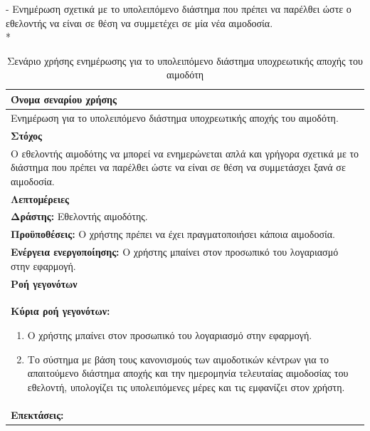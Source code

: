 \newpage		
- Ενημέρωση σχετικά με το υπολειπόμενο διάστημα που πρέπει να παρέλθει ώστε ο εθελοντής να είναι σε θέση να συμμετέχει σε μία νέα αιμοδοσία.
\\*
\begin{table}[H]
	\begin{center}
	    \begin{tabular}{|p{\dimexpr \linewidth-2\tabcolsep}|}
	    \hline
	    \rowcolor{grayy}
	    \textbf{Όνομα σεναρίου χρήσης}
	    \\ \hline    
	     Ενημέρωση για το υπολειπόμενο διάστημα υποχρεωτικής αποχής του αιμοδότη.
	     \\ \hline
	    \rowcolor{grayy}
	    \textbf{\textbf{Στόχος}}
	    \\ \hline
	 	 Ο εθελοντής αιμοδότης να μπορεί να ενημερώνεται απλά και γρήγορα σχετικά με το διάστημα που πρέπει να παρέλθει ώστε να είναι σε θέση να συμμετάσχει ξανά σε αιμοδοσία.
	    \\ \hline
	    \rowcolor{grayy}
	    \textbf{Λεπτομέρειες}
	    \\ \hline
		\textbf{Δράστης:} Εθελοντής αιμοδότης.
		\\*
		\textbf{Προϋποθέσεις:} Ο χρήστης πρέπει να έχει πραγματοποιήσει κάποια αιμοδοσία.
		\\*
		\textbf{Ενέργεια ενεργοποίησης:} Ο χρήστης μπαίνει στον προσωπικό του λογαριασμό στην εφαρμογή.
		\\ \hline
		\rowcolor{grayy}    
	    \textbf{Ροή γεγονότων}
	    \\ \hline
		\textbf{Κύρια ροή γεγονότων:}
		\begin{enumerate}
			\item	 Ο χρήστης μπαίνει στον προσωπικό του λογαριασμό στην εφαρμογή.
			\item  Το σύστημα με βάση τους κανονισμούς των αιμοδοτικών κέντρων για το απαιτούμενο διάστημα αποχής και την ημερομηνία τελευταίας αιμοδοσίας του εθελοντή, υπολογίζει τις υπολειπόμενες μέρες και τις εμφανίζει στον χρήστη.
		\end{enumerate}
		\\ \hline
		\rowcolor{grayy}
		\textbf{Επεκτάσεις:}
		   \\ \hline
	    \end{tabular}
	    \caption{Σενάριο χρήσης ενημέρωσης για το υπολειπόμενο διάστημα υποχρεωτικής αποχής του αιμοδότη}
	    \label{tab:show_days_for_eligibility_to_donate} 
	\end{center}
\end{table}

